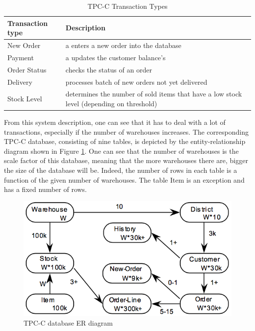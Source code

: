 \begin{table}[h]
	\centering
	\begin{tabular}{|m{4cm}|m{9cm}|}
		\hline
		\textbf{Transaction type} & \textbf{Description}\\
		\hline
		New Order & a enters a new order into the database\\
		\hline
		Payment & a updates the customer balance's\\
		\hline
		Order Status & checks the status of an order\\
		\hline
		Delivery & processes batch of new orders not yet delivered\\
		\hline
		Stock Level & determines the number of sold items that have a low stock level (depending on threshold)\\
		\hline
	\end{tabular}
	\caption{TPC-C Transaction Types}
	\label{table:tpcc_trans_type_list}
\end{table}

From this system description, one can see that it has to deal with a lot of transactions, especially if the number of warehouses increases.
The corresponding TPC-C database, consisting of nine tables, is depicted by the entity-relationship diagram shown in Figure \ref{fig:tpcc_erd}.
One can see that the number of warehouses is the scale factor of this database, meaning that the more warehouses there are, bigger the size of the database will be.
Indeed, the number of rows in each table is a function of the given number of warehouses.
The table Item is an exception and has a fixed number of rows.

\begin{figure}[h]
	\centering
	\includegraphics[scale=0.5]{figures/tpcc_erd.png}
	\caption{TPC-C database ER diagram \cite[p. 11]{tpcc10}}
	\label{fig:tpcc_erd}
\end{figure}

